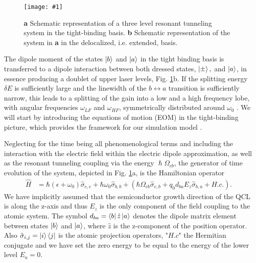 \documentclass[]{spie}  %
\newcommand{\includegraphicsXL}[1]{\texttt{[image: \#1]}}
\def\h{\hat}
\def\h{\hat}
\begin{document}
\begin{figure}[h!]
	\begin{center}
		\includegraphicsXL{IMGS/basis_compare.eps}
		\caption{ \textbf{a} Schematic representation of a three level resonant tunneling system in the tight-binding basis. \textbf{b} Schematic representation of the system in \textbf{a} in the delocalized, i.e. extended, basis.} \label{fig:basis_compare}
	\end{center}	
\end{figure}

The dipole moment of the states $\ket{b}$ and $\ket{a}$ in the tight binding basis is transferred to a dipole interaction between both dressed states, $\ket{\pm},$ and $\ket{a}$, in essence producing a doublet of upper laser levels, Fig. \ref{fig:basis_compare}b. If the splitting energy $\delta E$ is sufficiently large and the linewidth of the $b\leftrightarrow a$ transition is sufficiently narrow, this leads to a splitting of the gain into a low and a high frequency lobe, with angular frequencies $\omega_{LF}$ and $\omega_{HF}$, symmetrically distributed around $\omega_0$ \cite{dupont2010simplified}. We will start by introducing the equations of motion (EOM) in the tight-binding picture, which provides the framework for our simulation model \cite{petz2016}.

Neglecting for the time being all phenomenological terms and including the interaction with the electric field within the electric dipole approximation, as well as the resonant tunneling coupling via the energy $\hslash\Omega_{cb}$, the generator of time evolution of the system, depicted in Fig. \ref{fig:basis_compare}a, is the Hamiltonian operator
\begin{align}
\label{eq:hamiltonian-operatorform}
\h{H} &= \hbar(\epsilon+\omega_0)  \h\sigma_{c,c} +\hbar\omega_0 \h\sigma_{b,b} + (\hbar\Omega_{cb}\h\sigma_{c,b} + q_0d_{ba}E_z \h\sigma_{b,a}+H.c.).
\end{align}
 We have implicitly assumed that the semiconductor growth direction of the QCL is along the z-axis and thus $E_z$ is the only component of the field coupling to the atomic system. The symbol $d_{ba} = \bra{b}\h{z}\ket{a} $ denotes the dipole matrix element between states $\ket{b}$ and $\ket{a}$, where $\h{z}$ is the z-component of the position operator. Also $\h \sigma_{i,j} =\ket{i}\bra{j}$ is the atomic projection operators, "$H.c$" the Hermitian conjugate and we have set the zero energy to be equal to the energy of the lower level $E_a = 0$.
\end{document}
